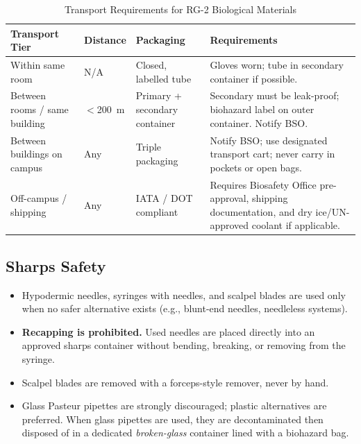 \begin{table}[H]
\centering
\caption{Transport Requirements for RG-2 Biological Materials}
\label{tab:transport}
\footnotesize\sffamily
\begin{tabularx}{\linewidth}{@{} L{3.0cm} L{2.4cm} L{2.4cm} X @{}}
\toprule
{}
\color{white}\textbf{Transport Tier} &
\color{white}\textbf{Distance} &
\color{white}\textbf{Packaging} &
\color{white}\textbf{Requirements} \\
\midrule
Within same room &
N/A &
Closed, labelled tube &
Gloves worn; tube in secondary container if possible. \\
Between rooms / same building &
$<$200~m &
Primary + secondary container &
Secondary must be leak-proof; biohazard label on outer container. Notify BSO. \\
Between buildings on campus &
Any &
Triple packaging &
Notify BSO; use designated transport cart; never carry in pockets or open bags. \\
Off-campus / shipping &
Any &
IATA / DOT compliant &
Requires Biosafety Office pre-approval, shipping documentation, and dry ice/UN-approved coolant if applicable. \\
\bottomrule
\end{tabularx}
\end{table}

\subsection{Sharps Safety}

\begin{itemize}[leftmargin=1.6em, itemsep=3pt]
  \item Hypodermic needles, syringes with needles, and scalpel blades are used only
        when no safer alternative exists (e.g., blunt-end needles, needleless systems).
  \item \textbf{Recapping is prohibited.} Used needles are placed directly into an
        approved sharps container without bending, breaking, or removing from the syringe.
  \item Scalpel blades are removed with a forceps-style remover, never by hand.
  \item Glass Pasteur pipettes are strongly discouraged; plastic alternatives are
        preferred. When glass pipettes are used, they are decontaminated then disposed
        of in a dedicated \emph{broken-glass} container lined with a biohazard bag.
\end{itemize}

